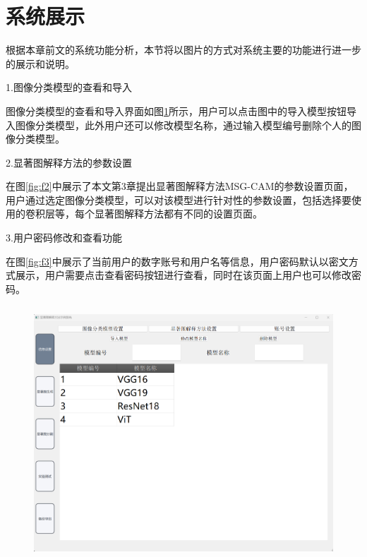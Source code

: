 \section{系统展示}
根据本章前文的系统功能分析，本节将以图片的方式对系统主要的功能进行进一步的展示和说明。

1.图像分类模型的查看和导入

图像分类模型的查看和导入界面如图\ref{fig:f1}所示，用户可以点击图中的导入模型按钮导入图像分类模型，此外用户还可以修改模型名称，通过输入模型编号删除个人的图像分类模型。

2.显著图解释方法的参数设置

在图\ref{fig:f2}中展示了本文第3章提出显著图解释方法MSG-CAM的参数设置页面，用户通过选定图像分类模型，可以对该模型进行针对性的参数设置，包括选择要使用的卷积层等，每个显著图解释方法都有不同的设置页面。


3.用户密码修改和查看功能

在图\ref{fig:f3}中展示了当前用户的数字账号和用户名等信息，用户密码默认以密文方式展示，用户需要点击查看密码按钮进行查看，同时在该页面上用户也可以修改密码。
\begin{figure}[H]
	\centering 
	\includegraphics[width=15cm,height=9.5cm]{fig/ch5/f1.png}
	\label{fig:f1}
\end{figure}

